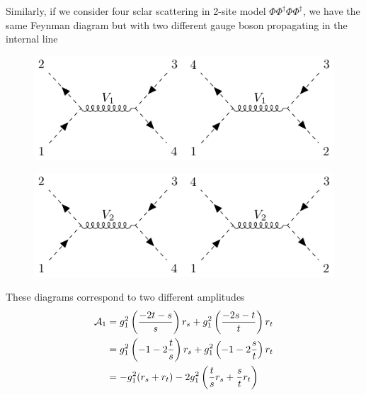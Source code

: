 \documentclass[12pt]{article}
\numberwithin{equation}{section}
\begin{document}
Similarly, if we consider four sclar scattering in 2-site model $\Phi\Phi^\dagger\Phi\Phi^\dagger$, we have the same Feynman diagram but with two different gauge boson propagating in the internal line
\begin{figure}[H]
    \centering
    \includegraphics{4ptt1.pdf}
\end{figure}
\begin{figure}[H]
    \centering
    \includegraphics{4ptt2.pdf}
\end{figure}
These diagrams correspond to two different amplitudes
\begin{align}
    \mathcal{A}_1&=g_1^2\left(\frac{-2t-s}{s}\right)r_s+g_1^2\left(\frac{-2s-t}{t}\right)r_t\notag\\
    &=g_1^2\left(-1-2\frac{t}{s}\right)r_s+g_1^2\left(-1-2\frac{s}{t}\right)r_t\notag\\
    &=-g_1^2(r_s+r_t)-2g_1^2\left(\frac{t}{s}r_s+\frac{s}{t}r_t\right)
\end{align}
\end{document}
